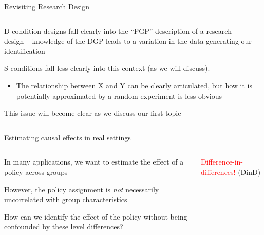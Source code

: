 \documentclass[notes,11pt, aspectratio=169]{beamer}
\newenvironment{wideitemize}{\itemize\addtolength{\itemsep}{10pt}}{\enditemize}
\begin{document}
\begin{frame}{Revisiting Research Design}
  \begin{columns}[T] %
    \begin{column}{0.7\textwidth}
      \begin{wideitemize}
      \item D-condition designs fall clearly into the ``PGP''
        description of a research design -- knowledge of the DGP leads
        to a variation in the data generating our identification
      \item S-conditions fall less clearly into this context (as we
        will discuss).
        \begin{itemize}
        \item The relationship between X and Y can be clearly
          articulated, but how it is potentially approximated by a
          random experiment is less obvious
        \end{itemize}
      \item This issue will become clear as we discuss our first topic
      \end{wideitemize}
    \end{column}%
    \hfill%
    \begin{column}{.7\textwidth}

    \end{column}%
  \end{columns}
\end{frame}


\begin{frame}{Estimating causal effects in real settings}
  \begin{columns}[T] %
    \begin{column}{.58\textwidth}
      \begin{wideitemize}
      \item In many applications, we want to estimate the effect of a policy across groups
      \item However, the policy assignment is  \emph{not} necessarily uncorrelated with group characteristics
      \item How can we identify the effect of the policy without being confounded by these level differences?
      \end{wideitemize}
    \end{column}%
    \hfill%
    \begin{column}{.38\textwidth}
      {
        \vspace{30pt}
      \begin{center}
        \Large \textcolor{red}{Difference-in-differences!}
        \normalsize (DinD)
        \end{center}
        }
    \end{column}%
  \end{columns}
\end{frame}
\end{document}
